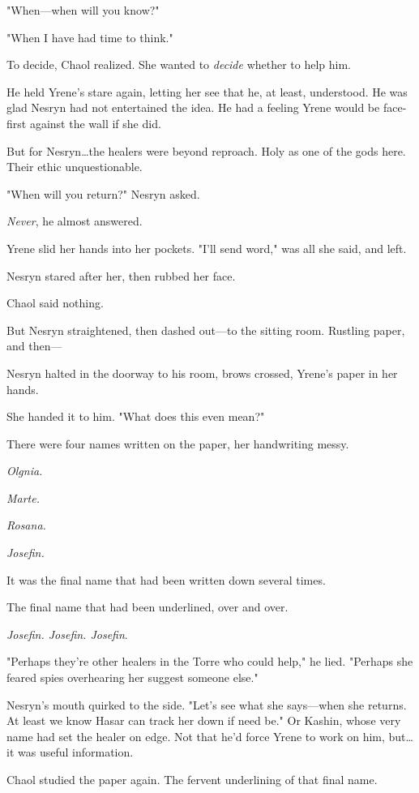 "When---when will you know?"

"When I have had time to think."

To decide, Chaol realized.
She wanted to \emph{decide} whether to help him.

He held Yrene's stare again, letting her see that he, at least, understood.
He was glad Nesryn had not entertained the idea.
He had a feeling Yrene would be face-first against the wall if she did.

But for Nesryn\ldots the healers were beyond reproach.
Holy as one of the gods here.
Their ethic unquestionable.

"When will you return?"
Nesryn asked.

\emph{Never}, he almost answered.

Yrene slid her hands into her pockets.
"I'll send word," was all she said, and left.

Nesryn stared after her, then rubbed her face.

Chaol said nothing.

But Nesryn straightened, then dashed out---to the sitting room.
Rustling paper, and then---

Nesryn halted in the doorway to his room, brows crossed, Yrene's paper in her hands.

She handed it to him.
"What does this even mean?"

There were four names written on the paper, her handwriting messy.

\emph{Olgnia.}

\emph{Marte.}

\emph{Rosana.}

\emph{Josefin.}

It was the final name that had been written down several times.

The final name that had been underlined, over and over.

\emph{Josefin.
Josefin.
Josefin}.

"Perhaps they're other healers in the Torre who could help," he lied.
"Perhaps she feared spies overhearing her suggest someone else."

Nesryn's mouth quirked to the side.
"Let's see what she says---when she returns.
At least we know Hasar can track her down if need be."
Or Kashin, whose very name had set the healer on edge.
Not that he'd force Yrene to work on him, but\ldots it was useful information.

Chaol studied the paper again.
The fervent underlining of that final name.

